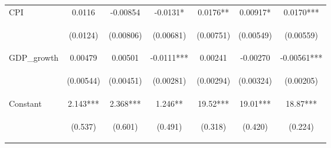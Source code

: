 \documentclass[]{article}
\begin{document}
\begin{center}
\begin{tabular}{lcccccc}
CPI & 0.0116 & -0.00854 & -0.0131* & 0.0176** & 0.00917* & 0.0170*** \\
\vspace{4pt} & \begin{footnotesize}(0.0124)\end{footnotesize} & \begin{footnotesize}(0.00806)\end{footnotesize} & \begin{footnotesize}(0.00681)\end{footnotesize} & \begin{footnotesize}(0.00751)\end{footnotesize} & \begin{footnotesize}(0.00549)\end{footnotesize} & \begin{footnotesize}(0.00559)\end{footnotesize} \\
GDP\_growth & 0.00479 & 0.00501 & -0.0111*** & 0.00241 & -0.00270 & -0.00561*** \\
\vspace{4pt} & \begin{footnotesize}(0.00544)\end{footnotesize} & \begin{footnotesize}(0.00451)\end{footnotesize} & \begin{footnotesize}(0.00281)\end{footnotesize} & \begin{footnotesize}(0.00294)\end{footnotesize} & \begin{footnotesize}(0.00324)\end{footnotesize} & \begin{footnotesize}(0.00205)\end{footnotesize} \\
Constant & 2.143*** & 2.368*** & 1.246** & 19.52*** & 19.01*** & 18.87*** \\
 & \begin{footnotesize}(0.537)\end{footnotesize} & \begin{footnotesize}(0.601)\end{footnotesize} & \begin{footnotesize}(0.491)\end{footnotesize} & \begin{footnotesize}(0.318)\end{footnotesize} & \begin{footnotesize}(0.420)\end{footnotesize} & \begin{footnotesize}(0.224)\end{footnotesize} \\

\end{tabular}
\end{center}
\end{document}

